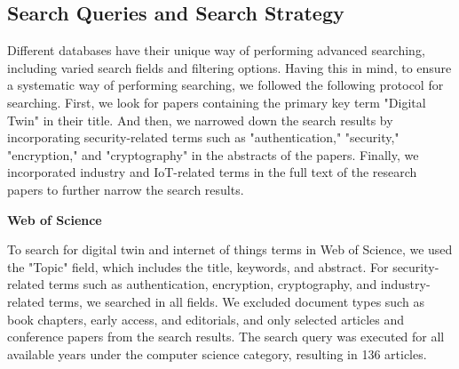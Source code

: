 \subsection{Search Queries and Search Strategy}
Different databases have their unique way of performing advanced searching, including varied search fields and filtering options. Having this in mind, to ensure a systematic way of performing searching, we followed the following protocol for searching. First, we look for papers containing the primary key term "Digital Twin" in their title. And then, we narrowed down the search results by incorporating security-related terms such as "authentication," "security," "encryption," and "cryptography" in the abstracts of the papers. Finally, we incorporated industry and IoT-related terms in the full text of the research papers to further narrow the search results.




\textbf{Web of Science}

To search for digital twin and internet of things terms in Web of Science, we used the "Topic" field, which includes the title, keywords, and abstract. For security-related terms such as authentication, encryption, cryptography, and industry-related terms, we searched in all fields. We excluded document types such as book chapters, early access, and editorials, and only selected articles and conference papers from the search results. The search query was executed for all available years under the computer science category, resulting in 136 articles.

